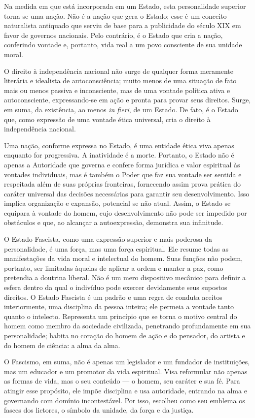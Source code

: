 \documentclass[12pt]{article}
\begin{document}
Na medida em que está incorporada em um Estado, esta personalidade superior torna-se uma nação. Não é a nação que gera o Estado; esse é um conceito naturalista antiquado que serviu de base para a publicidade do século XIX em favor de governos nacionais. Pelo contrário, é o Estado que cria a nação, conferindo vontade e, portanto, vida real a um povo consciente de sua unidade moral.

O direito à independência nacional não surge de qualquer forma meramente literária e idealista de autoconsciência; muito menos de uma situação de fato mais ou menos passiva e inconsciente, mas de uma vontade política ativa e autoconsciente, expressando-se em ação e pronta para provar seus direitos. Surge, em suma, da existência, ao menos \textit{in fieri}, de um Estado. De fato, é o Estado que, como expressão de uma vontade ética universal, cria o direito à independência nacional.

Uma nação, conforme expressa no Estado, é uma entidade ética viva apenas enquanto for progressiva. A inatividade é a morte. Portanto, o Estado não é apenas a Autoridade que governa e confere forma jurídica e valor espiritual às vontades individuais, mas é também o Poder que faz sua vontade ser sentida e respeitada além de suas próprias fronteiras, fornecendo assim prova prática do caráter universal das decisões necessárias para garantir seu desenvolvimento. Isso implica organização e expansão, potencial se não atual. Assim, o Estado se equipara à vontade do homem, cujo desenvolvimento não pode ser impedido por obstáculos e que, ao alcançar a autoexpressão, demonstra sua infinitude.

O Estado Fascista, como uma expressão superior e mais poderosa da personalidade, é uma força, mas uma força espiritual. Ele resume todas as manifestações da vida moral e intelectual do homem. Suas funções não podem, portanto, ser limitadas àquelas de aplicar a ordem e manter a paz, como pretendia a doutrina liberal. Não é um mero dispositivo mecânico para definir a esfera dentro da qual o indivíduo pode exercer devidamente seus supostos direitos. O Estado Fascista é um padrão e uma regra de conduta aceitos interiormente, uma disciplina da pessoa inteira; ele permeia a vontade tanto quanto o intelecto. Representa um princípio que se torna o motivo central do homem como membro da sociedade civilizada, penetrando profundamente em sua personalidade; habita no coração do homem de ação e do pensador, do artista e do homem de ciência: a alma da alma.

O Fascismo, em suma, não é apenas um legislador e um fundador de instituições, mas um educador e um promotor da vida espiritual. Visa reformular não apenas as formas de vida, mas o seu conteúdo — o homem, seu caráter e sua fé. Para atingir esse propósito, ele impõe disciplina e usa autoridade, entrando na alma e governando com domínio incontestável. Por isso, escolheu como seu emblema os fasces dos lictores, o símbolo da unidade, da força e da justiça.
\end{document}
